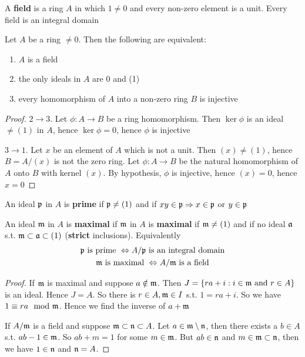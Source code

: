 \documentclass[11pt]{article}
\begin{document}
A \textbf{field} is a ring \(A\) in which \(1\neq 0\) and every non-zero element is a unit. Every field is
an integral domain

\begin{proposition}[]
Let \(A\) be a ring \(\neq 0\). Then the following are equivalent:
\begin{enumerate}
\item \(A\) is a field
\item the only ideals in \(A\) are 0 and (1)
\item every homomorphism of \(A\) into a non-zero ring \(B\) is injective
\end{enumerate}
\end{proposition}

\begin{proof}
\(2\to 3\). Let \(\phi:A\to B\) be a ring homomorphism. Then \(\ker\phi\) is an ideal \(\neq(1)\) in \(A\),
hence \(\ker\phi=0\), hence \(\phi\) is injective

\(3\to 1\). Let \(x\) be an element of \(A\) which is not a unit. Then \((x)\neq(1)\),
hence \(B=A/(x)\) is not the zero ring. Let \(\phi:A\to B\) be the natural homomorphism of \(A\)
onto \(B\) with kernel \((x)\). By hypothesis, \(\phi\) is injective, hence \((x)=0\), hence \(x=0\)
\end{proof}

An ideal \(\mathfrak{p}\) in \(A\) is \textbf{prime} if \(\mathfrak{p}\neq(1)\) and if \(xy\in\mathfrak{p}\Rightarrow x\in\mathfrak{p}\) or \(y\in\mathfrak{p}\)

An ideal \(\mathfrak{m}\) in \(A\) is \textbf{maximal} if \(\mathfrak{m}\) in \(A\) is \textbf{maximal} if \(\mathfrak{m}\neq(1)\) and if no
ideal \(\mathfrak{a}\) s.t. \(\mathfrak{m}\subset\mathfrak{a}\subset(1)\) (\textbf{strict} inclusions). Equivalently
\begin{gather*}
\mathfrak{p}\text{ is prime } \Leftrightarrow A/\mathfrak{p}\text{ is an integral domain}\\
\mathfrak{m}\text{ is maximal } \Leftrightarrow A/\mathfrak{m}\text{ is a field}
\end{gather*}
\begin{proof}
If \(\mathfrak{m}\) is maximal and suppose \(a\notin\mathfrak{m}\). Then \(J=\{ra+i:i\in \mathfrak{m}\text{ and }r\in A\}\) is an ideal.
Hence \(J=A\). So there is \(r\in A, \mathfrak{m}\in I\) s.t. \(1=ra+i\). So we have \(1\equiv ra\mod {\mathfrak{m}}\). Hence we
find the inverse of \(a+\mathfrak{m}\)

If \(A/\mathfrak{m}\) is a field and suppose \(\mathfrak{m}\subset\mathfrak{n}\subset A\). Let \(a\in\mathfrak{m}\setminus\mathfrak{n}\), then there exists a \(b\in A\)
s.t. \(ab-1\in\mathfrak{m}\). So \(ab+m=1\) for some \(m\in\mathfrak{m}\). But \(ab\in\mathfrak{n}\) and \(m\in\mathfrak{m}\subset\mathfrak{n}\), then we
have \(1\in\mathfrak{n}\) and \(\mathfrak{n}=A\).
\end{proof}
\end{document}

